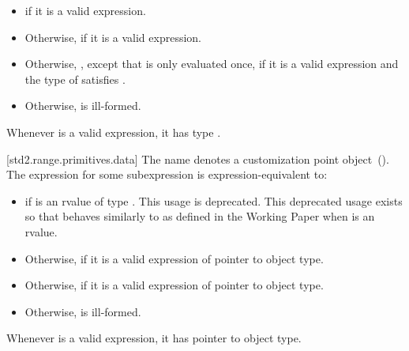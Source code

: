 \begin{itemize}
\item
   if it is a valid expression.

\item
  Otherwise,  if it is a valid expression.

\item
  Otherwise, ,
  except that  is only evaluated once, if it is a valid expression and the type of
   satisfies .

\item
  Otherwise,  is ill-formed.
\end{itemize}

\pnum
\enternote Whenever  is a valid expression, it
has type . \exitnote

[std2.range.primitives.data]{}
\pnum
The name  denotes a customization point
object~(). The expression
 for some subexpression  is
expression-equivalent to:

\begin{itemize}
\item
   if  is an rvalue of
  type . This usage is deprecated. \enternote
  This deprecated usage exists so that  behaves
  similarly to  as defined in the \Cpp Working
  Paper when  is an rvalue. \exitnote

\item
  Otherwise,  if it is a valid expression of pointer to object type.

\item
  Otherwise,  if it is a valid expression of pointer to object type.

\item
  Otherwise,  is ill-formed.
\end{itemize}

\pnum
\enternote Whenever  is a valid expression, it
has pointer to object type. \exitnote

